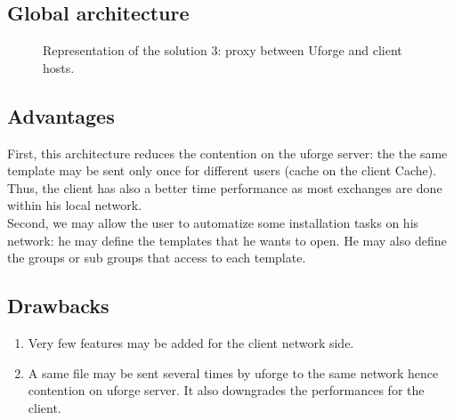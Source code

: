 \documentclass[12pt]{article}											%
\begin{document}
\subsection{Global architecture}

	\begin{figure}[t]
	\begin{center}
		\caption{Representation of the solution 3: proxy between Uforge and client hosts.}
	\end{center}
	\end{figure}


\subsection{Advantages}
	First, this architecture reduces the contention on the uforge server: the the same template may be sent only once for different users (cache on the client Cache).   Thus, the client has also a better time performance as most exchanges are done within his local network.\\

	Second, we may allow the user to automatize some installation tasks on his network:  he may define the templates that he wants to open.  He may also define the groups or sub groups that access to each template.


\subsection{Drawbacks}
	\begin{enumerate}
		\item Very few features may be added for the client network side.
		\item A same file may be sent several times by uforge to the same network hence contention on uforge server.  It also downgrades the performances for the client.
	\end{enumerate}
\end{document}
